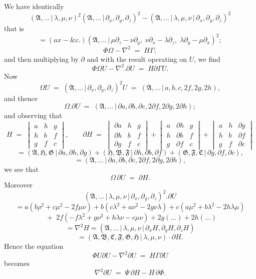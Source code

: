 \documentclass[11pt,a4paper]{article}
\providecommand{\mid}{\,|\,}
\begin{document}
We have identically
\[
(\mathfrak{A},\ldots\mid \lambda,\mu,\nu)^2(\mathfrak{A},\ldots\mid \partial_x,\partial_y,\partial_z)^2 - (\mathfrak{A},\ldots\mid \lambda,\mu,\nu\mid \partial_x,\partial_y,\partial_z)^2
\]
that is
\[
= (ax - \&c.)(\mathfrak{A},\ldots\mid \mu\partial_z - \nu\partial_y,\;\nu\partial_x - \lambda\partial_z,\;\lambda\partial_y - \mu\partial_x)^2;
\]
\[
\Phi\Omega - \nabla^2 \;=\; H\Gamma;
\]
and then multiplying by $\partial$ and with the result operating on $U$, we find
\[
\Phi\Omega U - \nabla^2.\partial U \;=\; H\partial\Gamma U.
\]
Now
\[
\Omega U \;=\; (\mathfrak{A},\ldots\mid \partial_x,\partial_y,\partial_z)^2 U \;=\; (\mathfrak{A},\ldots\mid a,b,c,2f,2g,2h),
\]
and thence
\[
\Omega.\partial U \;=\; (\mathfrak{A},\ldots\mid \partial a,\partial b,\partial c,2\partial f,2\partial g,2\partial h);
\]
and observing that
\[
H \;=\; \begin{vmatrix} a & h & g \\ h & b & f \\ g & f & c \end{vmatrix},\qquad \partial H \;=\; \begin{vmatrix} \partial a & h & g \\ \partial h & b & f \\ \partial g & f & c \end{vmatrix} + \begin{vmatrix} a & \partial h & g \\ h & \partial b & f \\ g & \partial f & c \end{vmatrix} + \begin{vmatrix} a & h & \partial g \\ h & b & \partial f \\ g & f & \partial c \end{vmatrix}
\]
\[
= (\mathfrak{A},\mathfrak{H},\mathfrak{G}\mid \partial a,\partial h,\partial g) + (\mathfrak{H},\mathfrak{B},\mathfrak{F}\mid \partial h,\partial b,\partial f) + (\mathfrak{G},\mathfrak{F},\mathfrak{C}\mid \partial g,\partial f,\partial c),
\]
\[
= (\mathfrak{A},\ldots\mid \partial a,\partial b,\partial c,2\partial f,2\partial g,2\partial h),
\]
we see that
\[
\Omega\,\partial U \;=\; \partial H.
\]
Moreover
\[
(\mathfrak{A},\ldots\mid \lambda,\mu,\nu\mid \partial_x,\partial_y,\partial_z)^2.\partial U
\]
\[
= a(b\rho^2 + c\mu^2 - 2f\mu\nu) + b(c\lambda^2 + a\nu^2 - 2g\nu\lambda) + c(a\mu^2 + b\lambda^2 - 2h\lambda\mu)
\]
\[
\;+\; 2f(-f\lambda^2 + g\nu^2 + h\lambda\nu - c\mu\nu) + 2g(\ldots) + 2h(\ldots)
\]
\[
= \nabla^2 H = (\mathfrak{A},\ldots\mid \lambda,\mu,\nu\mid \partial_x H,\partial_y H,\partial_z H)
\]
\[
= (\mathfrak{A},\mathfrak{B},\mathfrak{C},\mathfrak{F},\mathfrak{G},\mathfrak{H}\mid \lambda,\mu,\nu)\cdot\partial H.
\]
Hence the equation
\[
\Phi U\partial U - \nabla^2\partial U \;=\; H\Gamma\partial U
\]
becomes
\[
\nabla^2\partial U \;=\; \Psi\,\partial H - H\,\partial\Phi.
\]
\end{document}
